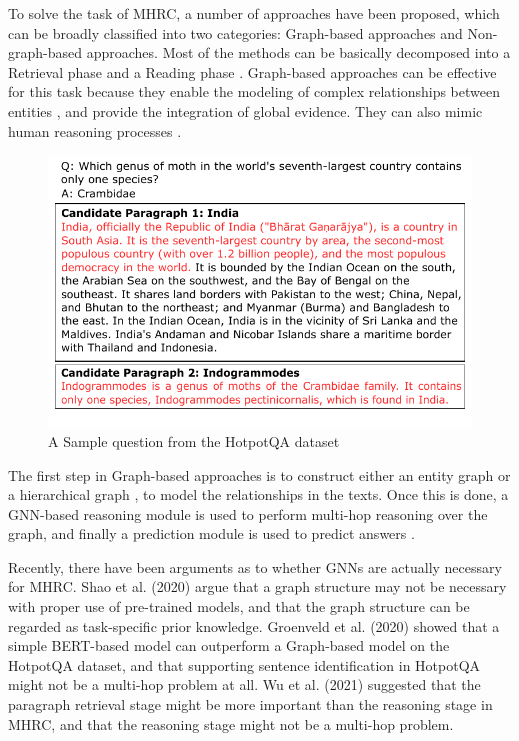 \documentclass[sigplan,screen]{acmart}
\begin{document}
To solve the task of MHRC, a number of approaches have been proposed, which can be broadly classified into two categories:
Graph-based approaches \cite{RN81} \cite{RN117} \cite{RN118} \cite{RN122} \cite{RN119} \cite{RN91} and Non-graph-based approaches. Most of the methods
can be basically decomposed into a Retrieval phase and a Reading phase \cite{RN166}. Graph-based approaches can be effective for this task because they 
enable the modeling of complex relationships between entities \cite{RN23}, and provide the integration of global evidence. They can also mimic human 
reasoning processes \cite{RN35}.

\begin{figure}[h] %
  \centering
  \includegraphics[width=\linewidth]{fig/fig_1_hotpot_example.pdf} %
  \caption{A Sample question from the HotpotQA dataset}
  \label{fig:sample_hotpotqa} %
\end{figure}


The first step in Graph-based approaches is to construct either an entity graph \cite{RN81} \cite{RN117} \cite{RN122} \cite{RN141} \cite{RN91} \cite{RN130} 
or a hierarchical graph \cite{RN124} \cite{RN119} \cite{RN130}, to model the relationships in the texts. Once this is done, a GNN-based 
reasoning module is used to perform multi-hop reasoning over the graph, and finally a prediction module is used to predict answers \cite{RN23}.

Recently, there have been arguments as to whether GNNs are actually necessary for MHRC. Shao et al. (2020) \cite{RN127} argue that 
a graph structure may not be necessary with proper use of pre-trained models, and that the graph structure can be regarded as task-specific 
prior knowledge. Groenveld et al. (2020) \cite{RN126} showed that a simple BERT-based model can outperform a Graph-based model on the HotpotQA dataset,
and that supporting sentence identification in HotpotQA might not be a multi-hop problem at all. Wu et al. (2021) \cite{RN106} suggested that
the paragraph retrieval stage might be more important than the reasoning stage in MHRC, and that the reasoning stage might not be a multi-hop problem.
\end{document}
